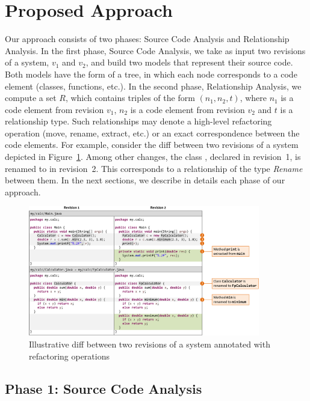 \section{Proposed Approach}
\label{SecApproach}

Our approach consists of two phases: Source Code Analysis and Relationship Analysis.
In the first phase, Source Code Analysis, we take as input two revisions of a system, $v_1$ and $v_2$, and build two models that represent their source code.
Both models have the form of a tree, in which each node corresponds to a code element (classes, functions, etc.).
In the second phase, Relationship Analysis, we compute a set $R$, which contains triples of the form $(n_1, n_2, t)$, where $n_1$ is a code element from revision $v_1$, $n_2$ is a code element from revision $v_2$ and $t$ is a relationship type.
Such relationships may denote a high-level refactoring operation (move, rename, extract, etc.) or an exact correspondence between the code elements.
For example, consider the diff between two revisions of a system depicted in Figure~\ref{FigDiff1}.
Among other changes, the class , declared in revision~1, is renamed to  in revision~2. This corresponds to a relationship of the type \emph{Rename} between them.
In the next sections, we describe in details each phase of our approach.

\begin{figure}[htb]
\centering
\includegraphics[width=0.9\textwidth]{img/diff1.pdf}
\caption{Illustrative diff between two revisions of a system annotated with refactoring operations}
\label{FigDiff1}
\end{figure}


\subsection{Phase 1: Source Code Analysis}

